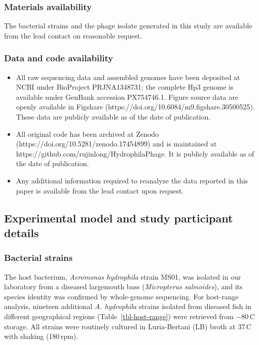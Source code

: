 \subsubsection*{Materials availability}
The bacterial strains and the phage isolate generated in this study are available
from the lead contact on reasonable request.

\subsubsection*{Data and code availability}
\begin{itemize}\tightlist
\item All raw sequencing data and assembled genomes have been deposited at NCBI
under BioProject PRJNA1348731; the complete Hp3 genome is available under GenBank
accession PX754746.1. Figure source data are openly available in Figshare
(https://doi.org/10.6084/m9.figshare.30500525). These data are publicly available
as of the date of publication.
\item All original code has been archived at Zenodo
(https://doi.org/10.5281/zenodo.17454899) and is maintained at
https://github.com/rujinlong/HydrophilaPhage. It is publicly available as of the
date of publication.
\item Any additional information required to reanalyze the data reported in this
paper is available from the lead contact upon request.
\end{itemize}

\subsection*{Experimental model and study participant details}

\subsubsection*{Bacterial strains}
The host bacterium, \emph{Aeromonas hydrophila} strain MS01, was isolated in our
laboratory from a diseased largemouth bass (\emph{Micropterus salmoides}), and its
species identity was confirmed by whole-genome sequencing. For host-range
analysis, nineteen additional \emph{A. hydrophila} strains isolated from diseased
fish in different geographical regions (Table~\ref{tbl-host-range}) were retrieved
from $-80$\,\textdegree C storage. All strains were routinely cultured in
Luria-Bertani (LB) broth at 37\,\textdegree C with shaking (180\,rpm).

